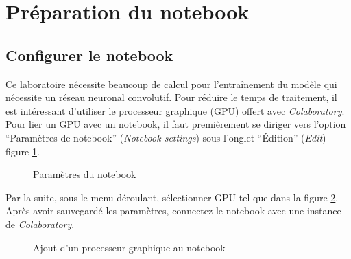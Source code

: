 \documentclass{article}
\begin{document}
\section{Préparation du notebook}
\subsection{Configurer le notebook}

Ce laboratoire nécessite beaucoup de calcul pour l'entraînement du modèle qui nécessite un réseau neuronal convolutif. Pour réduire le temps de traitement, il est intéressant d'utiliser le processeur graphique (GPU) offert avec \textit{Colaboratory}. Pour lier un GPU avec un notebook, il faut premièrement se diriger vers l'option ``Paramètres de notebook'' (\textit{Notebook settings}) sous l'onglet ``Édition'' (\textit{Edit}) figure \ref{fig:setting}.

\begin{figure}[H]
  \centering
  \caption{Paramètres du notebook}
  \label{fig:setting}
\end{figure}

Par la suite, sous le menu déroulant, sélectionner GPU tel que dans la figure \ref{fig:selectgpu}. Après avoir sauvegardé les paramètres, connectez le notebook avec une instance de \textit{Colaboratory}.

\begin{figure}[H]
  \centering
  \caption{Ajout d'un processeur graphique au notebook}
  \label{fig:selectgpu}
\end{figure}
\end{document}
